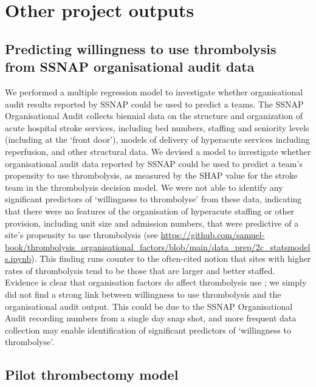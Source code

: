 \section{Other project outputs}
\label{sec:other_outputs}

\subsection{Predicting willingness to use thrombolysis from SSNAP organisational audit data}

We performed a multiple regression model to investigate whether organisational audit results reported by SSNAP could be used to predict a teams. The SSNAP Organisational Audit collects biennial data on the structure and organization of acute hospital stroke services, including bed numbers, staffing and seniority levels (including at the ‘front door’), models of delivery of hyperacute services including reperfusion, and other structural data. We devised a model to investigate whether organisational audit data reported by SSNAP could be used to predict a team’s propensity to use thrombolysis, as measured by the SHAP value for the stroke team in the thrombolysis decision model. We were not able to identify any significant predictors of ‘willingness to thrombolyse’ from these data, indicating that there were no features of the organisation of hyperacute staffing or other provision, including unit size and admission numbers, that were predictive of a site’s propensity to use thrombolysis (see \url{https://github.com/samuel-book/thrombolysis_organisational_factors/blob/main/data_prep/2c_statsmodels.ipynb}). This finding runs counter to the often-cited notion that sites with higher rates of thrombolysis tend to be those that are larger and better staffed. Evidence is clear that organisation factors do affect thrombolysis use \cite{carter-jones_stroke_2011}; we simply did not find a strong link between willingness to use thrombolysis and the organisational audit output. This could be due to the SSNAP Organisational Audit recording numbers from a single day snap shot, and more frequent data collection may enable identification of significant predictors of ‘willingness to thrombolyse’.

\subsection{Pilot thrombectomy model}

